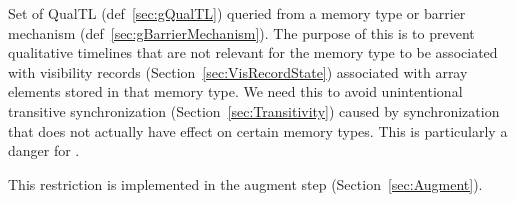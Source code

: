 
Set of \textsf{QualTL} (def~\ref{sec:gQualTL}) queried from a memory type or barrier mechanism (def~\ref{sec:gBarrierMechanism}).
The purpose of this is to prevent qualitative timelines that are not relevant for the memory type to be associated with visibility records (Section~\ref{sec:VisRecordState}) associated with array elements stored in that memory type.
We need this to avoid unintentional transitive synchronization (Section~\ref{sec:Transitivity}) caused by synchronization that does not actually have effect on certain memory types.
This is particularly a danger for .

This restriction is implemented in the augment step (Section~\ref{sec:Augment}).

